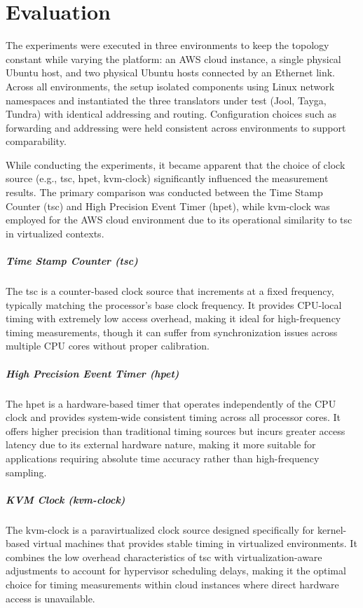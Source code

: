 \chapter{Evaluation}
The experiments were executed in three environments to keep the topology constant while varying the platform: an AWS cloud instance, a single physical Ubuntu host, and two physical Ubuntu hosts connected by an Ethernet link. Across all environments, the setup isolated components using Linux network namespaces and instantiated the three translators under test (Jool, Tayga, Tundra) with identical addressing and routing. Configuration choices such as forwarding and addressing were held consistent across environments to support comparability. 


While conducting the experiments, it became apparent that the choice of clock source (e.g., tsc, hpet, kvm-clock) significantly influenced the measurement results. The primary comparison was conducted between the Time Stamp Counter (tsc) and High Precision Event Timer (hpet), while kvm-clock was employed for the AWS cloud environment due to its operational similarity to tsc in virtualized contexts.

\paragraph{Time Stamp Counter (tsc)} The tsc is a counter-based clock source that increments at a fixed frequency, typically matching the processor's base clock frequency. It provides CPU-local timing with extremely low access overhead, making it ideal for high-frequency timing measurements, though it can suffer from synchronization issues across multiple CPU cores without proper calibration.
\paragraph{High Precision Event Timer (hpet)} The hpet is a hardware-based timer that operates independently of the CPU clock and provides system-wide consistent timing across all processor cores. It offers higher precision than traditional timing sources but incurs greater access latency due to its external hardware nature, making it more suitable for applications requiring absolute time accuracy rather than high-frequency sampling.
\paragraph{KVM Clock (kvm-clock)} The kvm-clock is a paravirtualized clock source designed specifically for kernel-based virtual machines that provides stable timing in virtualized environments. It combines the low overhead characteristics of tsc with virtualization-aware adjustments to account for hypervisor scheduling delays, making it the optimal choice for timing measurements within cloud instances where direct hardware access is unavailable.

